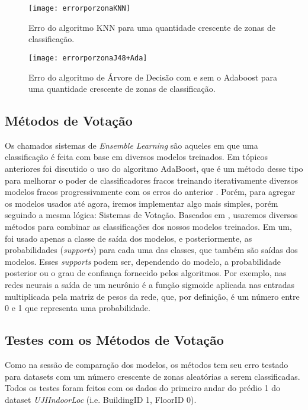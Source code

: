 \begin{figure}[H]
	\centering
	\caption{Erro do algoritmo KNN para uma quantidade crescente de zonas de classificação.}
  \texttt{[image: errorporzonaKNN]}
\label{fig:zonaKNN}

\end{figure}



\begin{figure}[H]
	\centering
	\caption{Erro do algoritmo de Árvore de Decisão com e sem o Adaboost  para uma quantidade crescente de zonas de classificação.}
  \texttt{[image: errorporzonaJ48+Ada]}
\label{fig:zonaAda}

\end{figure}

\subsection{Métodos de Votação}

Os chamados sistemas de \textit{Ensemble Learning} são aqueles em que uma classificação é feita com base em diversos modelos treinados. Em tópicos anteriores foi discutido o uso do algoritmo AdaBoost, que é um método desse tipo para melhorar o poder de classificadores fracos treinando iterativamente diversos modelos fracos progressivamente com os erros do anterior \cite {explainingadaboost}. Porém, para agregar os modelos usados até agora, iremos implementar algo mais simples, porém seguindo a mesma lógica: Sistemas de Votação. Baseados em \cite{Nagi2013}, usaremos diversos métodos para combinar as classificações dos nossos modelos treinados. Em um, foi usado apenas a classe de saída dos modelos, e posteriormente, as probabilidades (\textit{supports}) para cada uma das classes, que também são saídas dos modelos. Esses \textit{supports} podem ser, dependendo do modelo, a probabilidade posterior ou o grau de confiança fornecido pelos algoritmos. Por exemplo, nas redes neurais a saída de um neurônio é a função sigmoide aplicada nas entradas multiplicada pela matriz de pesos da rede, que, por definição, é um número entre 0 e 1 que representa uma probabilidade.




\subsection{Testes com os Métodos de Votação}

Como na sessão de comparação dos modelos, os métodos tem seu erro testado para datasets com um número crescente de zonas aleatórias a serem classificadas. Todos os testes foram feitos com os dados do primeiro andar do prédio 1 do dataset \textit{UJIIndoorLoc} (i.e. BuildingID 1, FloorID 0).




